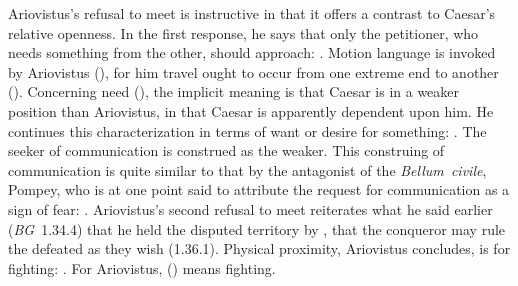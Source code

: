 \documentclass[12pt,letterpaper,oneside,final]{memoir}
\begin{document}
Ariovistus's refusal to meet is instructive in that it offers a contrast to Caesar's relative openness. In the first response, he says that only the petitioner, who needs something from the other, should approach: . Motion language is invoked by Ariovistus (), for him travel ought to occur from one extreme end to another (). Concerning need (), the implicit meaning is that Caesar is in a weaker position than Ariovistus, in that Caesar is apparently dependent upon him. He continues this characterization in terms of want or desire for something: . The seeker of communication is construed as the weaker. This construing of communication is quite similar to that by the antagonist of the \emph{Bellum~civile}, Pompey, who is at one point said to attribute the request for communication as a sign of fear: . Ariovistus's second refusal to meet reiterates what he said earlier (\emph{BG}~1.34.4) that he held the disputed territory by , that the conqueror may rule the defeated as they wish (1.36.1). Physical proximity, Ariovistus concludes, is for fighting: . For Ariovistus,  () means fighting.
\end{document}
